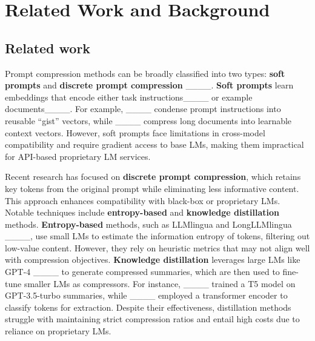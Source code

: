 \section{Related Work and Background}
\subsection{Related work}\label{sec:related}


Prompt compression methods can be broadly classified into two types: \textbf{soft prompts} and \textbf{discrete prompt compression} ____. \textbf{Soft prompts} learn embeddings that encode either task instructions____ or example documents____. For example, ____ condense prompt instructions into reusable ``gist'' vectors, while ____ compress long documents into learnable context vectors. However, soft prompts face limitations in cross-model compatibility and require gradient access to base LMs, making them impractical for API-based proprietary LM services.


Recent research has focused on \textbf{discrete prompt compression}, which retains key tokens from the original prompt while eliminating less informative content. This approach enhances compatibility with black-box or proprietary LMs. Notable techniques include \textbf{entropy-based} and \textbf{knowledge distillation} methods.
\textbf{Entropy-based} methods, such as LLMlingua and LongLLMlingua ____, use small LMs to estimate the information entropy of tokens, filtering out low-value content. However, they rely on heuristic metrics that may not align well with compression objectives.
\textbf{Knowledge distillation} leverages large LMs like GPT-4 ____ to generate compressed summaries, which are then used to fine-tune smaller LMs as compressors. For instance, ____ trained a T5 model on GPT-3.5-turbo summaries, while ____ employed a transformer encoder to classify tokens for extraction. Despite their effectiveness, distillation methods struggle with maintaining strict compression ratios and entail high costs due to reliance on proprietary LMs.

